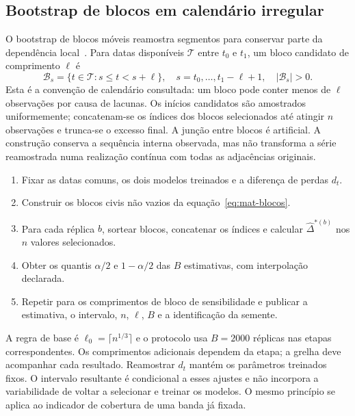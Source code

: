 \subsection{Bootstrap de blocos em calendário irregular}
\label{sec:mat-mbb}
O bootstrap de blocos móveis reamostra segmentos para conservar parte da dependência local~\parencite{Kunsch1989,Lahiri2003}. Para datas disponíveis $\mathcal T$ entre $t_0$ e $t_1$, um bloco candidato de comprimento $\ell$ é
\begin{equation}
\mathcal B_s=\{t\in\mathcal T:s\leq t<s+\ell\},
\quad s=t_0,\ldots,t_1-\ell+1,
\quad |\mathcal B_s|>0.
\label{eq:mat-blocos}
\end{equation}
Esta é a convenção de calendário consultada: um bloco pode conter menos de $\ell$ observações por causa de lacunas. Os inícios candidatos são amostrados uniformemente; concatenam-se os índices dos blocos selecionados até atingir $n$ observações e trunca-se o excesso final. A junção entre blocos é artificial. A construção conserva a sequência interna observada, mas não transforma a série reamostrada numa realização contínua com todas as adjacências originais.

\begin{tcolorbox}[colback=black!2,colframe=black!45,fontupper=\small,title={Algoritmo G.1 --- Intervalo para um contraste emparelhado}]
\begin{enumerate}[leftmargin=*,nosep]
\item Fixar as datas comuns, os dois modelos treinados e a diferença de perdas $d_t$.
\item Construir os blocos civis não vazios da equação~\ref{eq:mat-blocos}.
\item Para cada réplica $b$, sortear blocos, concatenar os índices e calcular $\widehat\Delta^{*(b)}$ nos $n$ valores selecionados.
\item Obter os quantis $\alpha/2$ e $1-\alpha/2$ das $B$ estimativas, com interpolação declarada.
\item Repetir para os comprimentos de bloco de sensibilidade e publicar a estimativa, o intervalo, $n$, $\ell$, $B$ e a identificação da semente.
\end{enumerate}
\end{tcolorbox}

A regra de base é $\ell_0=\lceil n^{1/3}\rceil$ e o protocolo usa $B=2000$ réplicas nas etapas correspondentes. Os comprimentos adicionais dependem da etapa; a grelha deve acompanhar cada resultado. Reamostrar $d_t$ mantém os parâmetros treinados fixos. O intervalo resultante é condicional a esses ajustes e não incorpora a variabilidade de voltar a selecionar e treinar os modelos. O mesmo princípio se aplica ao indicador de cobertura de uma banda já fixada.

